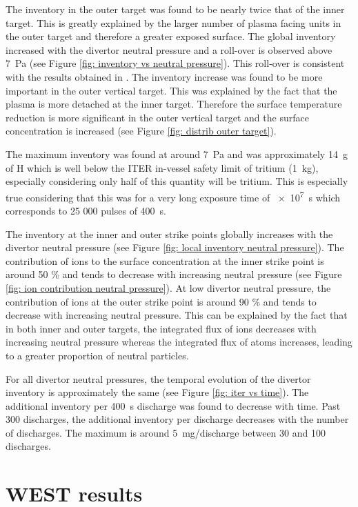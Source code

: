 The inventory in the outer target was found to be nearly twice that of the inner target.
This is greatly explained by the larger number of plasma facing units in the outer target and therefore a greater exposed surface.
The global inventory increased with the divertor neutral pressure and a roll-over is observed above \SI{7}{Pa} (see Figure \ref{fig: inventory vs neutral pressure}).
This roll-over is consistent with the results obtained in \cite{pitts_physics_2019}.
The inventory increase was found to be more important in the outer vertical target.
This was explained by the fact that the plasma is more detached at the inner target.
Therefore the surface temperature reduction is more significant in the outer vertical target and the surface concentration is increased (see Figure \ref{fig: distrib outer target}).

The maximum inventory was found at around \SI{7}{Pa} and was approximately \SI{14}{g} of H which is well below the ITER in-vessel safety limit of tritium (\SI{1}{kg}), especially considering only half of this quantity will be tritium.
This is especially true considering that this was for a very long exposure time of \SI{e7}{s} which corresponds to 25 000 pulses of \SI{400}{s}.


The inventory at the inner and outer strike points globally increases with the divertor neutral pressure (see Figure \ref{fig: local inventory neutral pressure}).
The contribution of ions to the surface concentration at the inner strike point is around 50 \% and tends to decrease with increasing neutral pressure (see Figure \ref{fig: ion contribution neutral pressure}).
At low divertor neutral pressure, the contribution of ions at the outer strike point is around 90 \% and tends to decrease with increasing neutral pressure.
This can be explained by the fact that in both inner and outer targets, the integrated flux of ions decreases with increasing neutral pressure whereas the integrated flux of atoms increases, leading to a greater proportion of neutral particles.

For all divertor neutral pressures, the temporal evolution of the divertor inventory is approximately the same (see Figure \ref{fig: iter vs time}).
The additional inventory per \SI{400}{s} discharge was found to decrease with time.
Past 300 discharges, the additional inventory per discharge decreases with the number of discharges.
The maximum is around \SI{5}{mg/discharge} between 30 and 100 discharges.

\section{WEST results}

